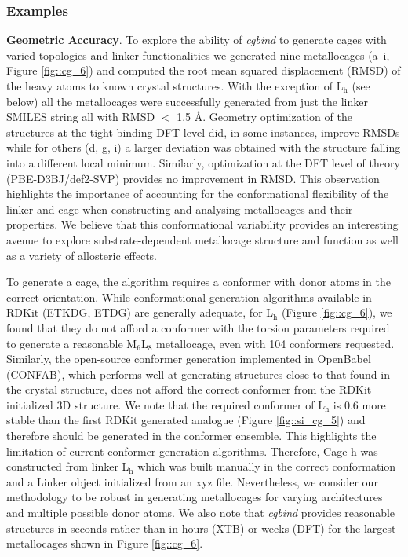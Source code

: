 \documentclass[../../main.tex]{subfiles}
\newcommand{\cgbind}{\emph{cgbind }}
\begin{document}
\subsubsection{Examples}
{\bfseries{Geometric Accuracy}}. To explore the ability of \cgbind to generate cages with varied topologies and linker functionalities we generated nine metallocages (a–i, Figure \ref{fig::cg_6}) and computed the root mean squared displacement (RMSD) of the heavy atoms to known crystal structures. With the exception of L${}_\text{h}$ (see below) all the metallocages were successfully generated from just the linker SMILES string all with RMSD $<$ 1.5 \AA. Geometry optimization of the structures at the tight-binding DFT level did, in some instances, improve RMSDs while for others (d, g, i) a larger deviation was obtained with the structure falling into a different local minimum. Similarly, optimization at the DFT level of theory (PBE-D3BJ/def2-SVP) provides no improvement in RMSD. This observation highlights the importance of accounting for the conformational flexibility of the linker and cage when constructing and analysing metallocages and their properties. We believe that this conformational variability provides an interesting avenue to explore substrate-dependent metallocage structure and function as well as a variety of allosteric effects. 

To generate a cage, the algorithm requires a conformer with donor atoms in the correct orientation. While conformational generation algorithms available in RDKit (ETKDG, ETDG) are generally adequate, for L$_\text{h}$ (Figure \ref{fig::cg_6}), we found that they do not afford a conformer with the torsion parameters required to generate a reasonable M${}_6$L${}_8$ metallocage, even with 104 conformers requested. Similarly, the open-source conformer generation implemented in OpenBabel (CONFAB),\cite{OBoyle2011} which performs well at generating structures close to that found in the crystal structure, does not afford the correct conformer from the RDKit initialized 3D structure.\cite{Ebejer2012} We note that the required conformer of L${}_\text{h}$ is 0.6 \kcalx more stable than the first RDKit generated analogue (Figure \ref{fig::si_cg_5}) and therefore should be generated in the conformer ensemble. This highlights the limitation of current conformer-generation algorithms. Therefore, Cage h was constructed from linker L${}_\text{h}$ which was built manually in the correct conformation and a Linker object initialized from an xyz file. Nevertheless, we consider our methodology to be robust in generating metallocages for varying architectures and multiple possible donor atoms. We also note that \cgbind provides reasonable structures in seconds rather than in hours (XTB) or weeks (DFT) for the largest metallocages shown in Figure \ref{fig::cg_6}.
\end{document}
